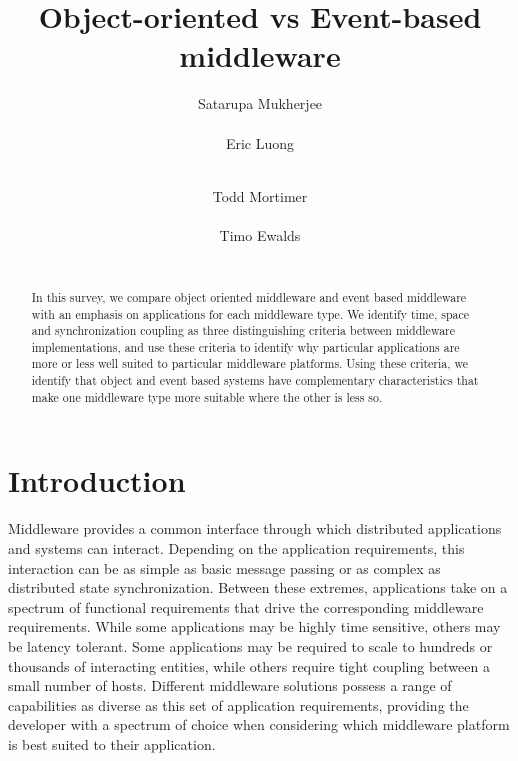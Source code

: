 \documentclass{acm_proc_article-sp}
\begin{document}
\title{Object-oriented vs Event-based middleware}


\author{
\alignauthor
Satarupa Mukherjee \\
       \\
\alignauthor
Eric Luong \\
       \\
\and  
\alignauthor 
Todd Mortimer \\
       \\
\alignauthor 
Timo Ewalds\\
      \\
}


\maketitle
\begin{abstract}

In this survey, we compare object oriented middleware and event based middleware with an emphasis on applications for each middleware type. We identify time, space and synchronization coupling as three distinguishing criteria between middleware implementations, and use these criteria to identify why particular applications are more or less well suited to particular middleware platforms. Using these criteria, we identify that object and event based systems have complementary characteristics that make one middleware type more suitable where the other is less so. 

\end{abstract}


\section{Introduction}
\label{sec:intro}


Middleware provides a common interface through which distributed applications and systems can interact. Depending on the application requirements, this interaction can be as simple as basic message passing or as complex as distributed state synchronization. Between these extremes, applications take on a spectrum of functional requirements that drive the corresponding middleware requirements. While some applications may be highly time sensitive, others may be latency tolerant. Some applications may be required to scale to hundreds or thousands of interacting entities, while others require tight coupling between a small number of hosts. Different middleware solutions possess a range of capabilities as diverse as this set of application requirements, providing the developer with a spectrum of choice when considering which middleware platform is best suited to their application.
\end{document}
